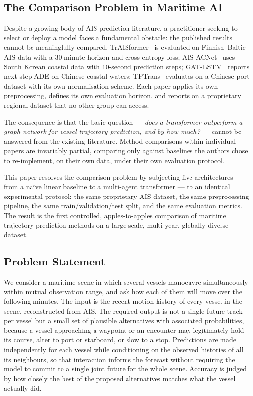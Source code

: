 \documentclass[12pt, a4paper]{article}
\begin{document}
  \subsection{The Comparison Problem in Maritime AI}

  Despite a growing body of AIS prediction literature, a practitioner seeking to select
  or deploy a model faces a fundamental obstacle: the published results cannot be
  meaningfully compared.  TrAISformer~\citep{nguyen2021traisformer} is evaluated on
  Finnish–Baltic AIS data with a 30-minute horizon and cross-entropy loss;
  AIS-ACNet~\citep{shin2024aisacnet} uses South Korean coastal data with 10-second
  prediction steps; GAT-LSTM~\citep{zhao2023gatlstm} reports next-step ADE on
  Chinese coastal waters; TPTrans~\citep{wang2024tptrans} evaluates on a Chinese
  port dataset with its own normalisation scheme.  Each paper applies its own
  preprocessing, defines its own evaluation horizon, and reports on a proprietary
  regional dataset that no other group can access.

  The consequence is that the basic question — \textit{does a transformer outperform a
  graph network for vessel trajectory prediction, and by how much?} — cannot be answered
  from the existing literature.  Method comparisons within individual papers are invariably
  partial, comparing only against baselines the authors chose to re-implement, on their
  own data, under their own evaluation protocol.

  This paper resolves the comparison problem by subjecting five architectures — from a
  na\"{i}ve linear baseline to a multi-agent transformer — to an identical experimental
  protocol: the same proprietary AIS dataset, the same preprocessing pipeline, the same
  train/validation/test split, and the same evaluation metrics.  The result is the first
  controlled, apples-to-apples comparison of maritime trajectory prediction methods on
  a large-scale, multi-year, globally diverse dataset.

  \subsection{Problem Statement}

  We consider a maritime scene in which several vessels manoeuvre simultaneously
  within mutual observation range, and ask how each of them will move over the
  following minutes.  The input is the recent motion history of every vessel in
  the scene, reconstructed from AIS.  The required output is not a single future
  track per vessel but a small set of plausible alternatives with associated
  probabilities, because a vessel approaching a waypoint or an encounter may
  legitimately hold its course, alter to port or starboard, or slow to a stop.
  Predictions are made independently for each vessel while conditioning on the
  observed histories of all its neighbours, so that interaction informs the
  forecast without requiring the model to commit to a single joint future for
  the whole scene.  Accuracy is judged by how closely the best of the proposed
  alternatives matches what the vessel actually did.
\end{document}
